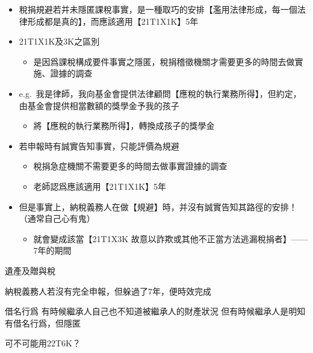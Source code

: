 \documentclass[]{ctexbook}
\providecommand{\tightlist}{%
  \setlength{\itemsep}{0pt}\setlength{\parskip}{0pt}}
\begin{document}
\begin{enumerate}
\begin{itemize}
    \begin{itemize}
    \tightlist
    \item
      稅捐規避若并未隱匿課稅事實，是一種取巧的安排【濫用法律形成，每一個法律形成都是真的】，而應該適用【21T1X1K】5年
    \item
      21T1X1K及3K之區別

      \begin{itemize}
      \tightlist
      \item
        是因爲課稅構成要件事實之隱匿，稅捐稽徵機關才需要更多的時間去做實施、證據的調查
      \end{itemize}
    \item
      e.g.~我是律師，我向基金會提供法律顧問【應稅的執行業務所得】，但約定，由基金會提供相當數額的獎學金予我的孩子

      \begin{itemize}
      \tightlist
      \item
        將【應稅的執行業務所得】，轉換成孩子的獎學金
      \end{itemize}
    \item
      若申報時有誠實告知事實，只能評價為規避

      \begin{itemize}
      \tightlist
      \item
        稅捐急症機關不需要更多的時間去做事實證據的調查
      \item
        老師認爲應該適用【21T1X1K】5年
      \end{itemize}
    \item
      但是事實上，納稅義務人在做【規避】時，并沒有誠實告知其路徑的安排！ （通常自己心有鬼）

      \begin{itemize}
      \tightlist
      \item
        就會變成該當【21T1X3K 故意以詐欺或其他不正當方法逃漏稅捐者】------7年的期間
      \end{itemize}
    \end{itemize}
  \end{itemize}
\end{enumerate}

遺產及贈與稅

納稅義務人若沒有完全申報，但躲過了7年，便時效完成

借名行爲
有時候繼承人自己也不知道被繼承人的財產狀況
但有時候繼承人是明知有借名行爲，但隱匿

可不可能用22T6K？
\end{document}
